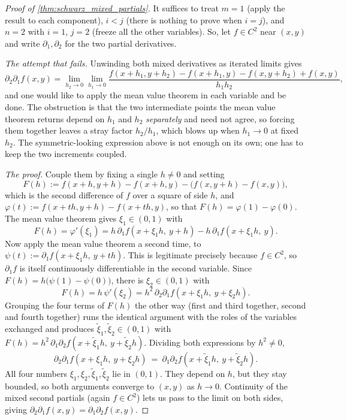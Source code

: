 \begin{proof}[Proof of \cref{thm:schwarz_mixed_partials}]
It suffices to treat $m=1$ (apply the result to each component), $i<j$ (there is nothing to
prove when $i=j$), and $n=2$ with $i=1$, $j=2$ (freeze all the other variables). So, let
$f \in C^2$ near $(x,y)$ and write $\partial_1,\partial_2$ for the two partial derivatives.

\textit{The attempt that fails.} Unwinding both mixed derivatives as iterated limits gives
\[\partial_2\partial_1f(x,y)
  = \lim_{h_2\to0}\lim_{h_1\to0}
    \frac{f(x+h_1,y+h_2) - f(x+h_1,y) - f(x,y+h_2) + f(x,y)}{h_1h_2},\]
and one would like to apply the mean value theorem in each variable and be done. The obstruction
is that the two intermediate points the mean value theorem returns depend on $h_1$ and $h_2$
\emph{separately} and need not agree, so forcing them together leaves a stray factor
$h_2/h_1$, which blows up when $h_1 \to 0$ at fixed $h_2$. The symmetric-looking expression
above is not enough on its own; one has to keep the two increments coupled.

\textit{The proof.} Couple them by fixing a single $h \neq 0$ and setting
\[F(h) := f(x+h,y+h) - f(x+h,y) - \big(f(x,y+h) - f(x,y)\big),\]
which is the second difference of $f$ over a square of side $h$, and
$\varphi(t) := f(x+th, y+h) - f(x+th, y)$, so that $F(h) = \varphi(1)-\varphi(0)$. The mean
value theorem gives $\xi_1 \in (0,1)$ with
\[F(h) = \varphi'(\xi_1) = h\,\partial_1f(x+\xi_1h,\ y+h) - h\,\partial_1f(x+\xi_1h,\ y).\]
Now apply the mean value theorem a second time, to $\psi(t) := \partial_1f(x+\xi_1h,\ y+th)$.
This is legitimate precisely because $f \in C^2$, so $\partial_1 f$ is itself continuously
differentiable in the second variable. Since $F(h) = h\big(\psi(1)-\psi(0)\big)$, there is
$\xi_2 \in (0,1)$ with
\[F(h) = h\,\psi'(\xi_2) = h^2\,\partial_2\partial_1f(x+\xi_1h,\ y+\xi_2h).\]
Grouping the four terms of $F(h)$ the other way (first and third together, second and fourth
together) runs the identical argument with the roles of the variables exchanged and produces
$\tilde\xi_1,\tilde\xi_2 \in (0,1)$ with
$F(h) = h^2\,\partial_1\partial_2f(x+\tilde\xi_1h,\ y+\tilde\xi_2h)$. Dividing both expressions
by $h^2 \neq 0$,
\[\partial_2\partial_1f(x+\xi_1h,\ y+\xi_2h)
  \ =\ \partial_1\partial_2f(x+\tilde\xi_1h,\ y+\tilde\xi_2h).\]
All four numbers $\xi_1,\xi_2,\tilde\xi_1,\tilde\xi_2$ lie in $(0,1)$. They depend on $h$, but
they stay bounded, so both arguments converge to $(x,y)$ as $h \to 0$. Continuity of the mixed
second partials (again $f \in C^2$) lets us pass to the limit on both sides, giving
$\partial_2\partial_1f(x,y) = \partial_1\partial_2f(x,y)$.
\end{proof}

